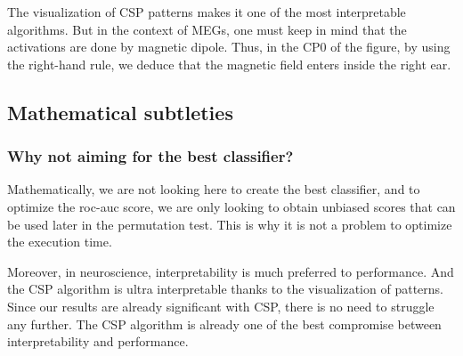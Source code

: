 The visualization of CSP patterns makes it one of the most interpretable algorithms. But in the context of MEGs, one must keep in mind that the activations are done by magnetic dipole. Thus, in the CP0 of the figure, by using the right-hand rule, we deduce that the magnetic field enters inside the right ear.

\subsection{Mathematical subtleties}

\subsubsection{Why not aiming for the best classifier?}
Mathematically, we are not looking here to create the best classifier, and to optimize the roc-auc score, we are only looking to obtain unbiased scores that can be used later in the permutation test. This is why it is not a problem to optimize the execution time.

Moreover, in neuroscience, interpretability is much preferred to performance. And the CSP algorithm is ultra interpretable thanks to the visualization of patterns. Since our results are already significant with CSP, there is no need to struggle any further. The CSP algorithm is already one of the best compromise between interpretability and performance.





